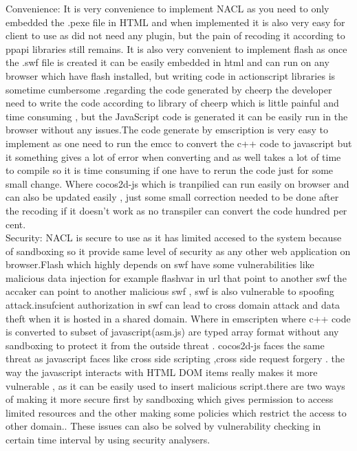 \documentclass[23pt]{article}
\begin{document}
{Convenience:  It is very convenience to implement NACL as you need to only embedded the .pexe file in HTML and when implemented it is also very easy for client to use as did not need any plugin, but the pain of recoding it according to ppapi libraries still remains. It is also very convenient to implement flash as once the .swf file is created it can be easily embedded in html and can run on any browser which have flash installed, but writing code in actionscript libraries  is sometime cumbersome .regarding the code generated by cheerp the developer need to write the code according to library of cheerp which is little painful and time consuming  , but the JavaScript code is generated it can be easily run in the browser without any issues.The code generate by emscription is very easy to implement as one need to  run the emcc to convert the c++ code to javascript but it something gives a lot of error when converting and as well takes a lot of time to compile so it is time consuming if one have to rerun the code just for some small change. Where cocos2d-js which is tranpilied can run easily on browser and can also be updated easily , just some small correction needed to be done after the recoding if it doesn’t work as no transpiler can convert the code hundred per cent. \\
Security: NACL is secure to use as it has limited accesed to the system because of sandboxing so it provide same level of security as any other web application on browser.Flash which highly depends on swf have some vulnerabilities like malicious data injection for example flashvar in url that point to another swf  the accaker can point to another malicious swf , swf is also vulnerable to spoofing attack.insufcient authorization in swf can lead to cross domain attack and data theft when it is hosted in a shared domain. Where in emscripten where c++ code is converted to subset of javascript(asm.js) are typed array format without any sandboxing to protect it from the outside threat . cocos2d-js faces the same threat as javascript faces like cross side scripting ,cross side request forgery . the way the javascript interacts with HTML DOM items really makes it more vulnerable , as it can be easily used to insert malicious script.there are two ways of making it more secure first by sandboxing which gives permission to access limited resources and the other making some policies which restrict the access to other domain.. These issues can also be solved by vulnerability checking in certain time interval by using security analysers.  \\
 \par}
\end{document}
